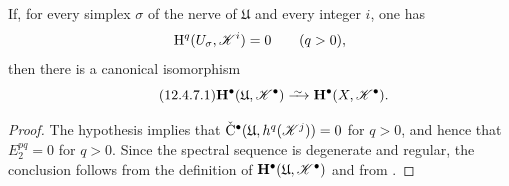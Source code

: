 \begin{corollary}[12.4.7]
\label{0.12.4.7}
If, for every simplex $\sigma$ of the nerve of $\mathfrak{U}$ and
every integer $i$, one has
\[
  \mathrm{H}^q(U_\sigma,\mathscr{K}^i)=0
  \qquad(q>0),
\]
then there is a canonical isomorphism
\begin{equation}
\label{0.12.4.7.1}
\tag{12.4.7.1}
  \bb{H}^\bullet(\mathfrak{U},\sh{K}^\bullet)
  \isoto
  \bb{H}^\bullet(X,\sh{K}^\bullet).
\end{equation}
\end{corollary}

\begin{proof}
The hypothesis implies that
$\check{\mathrm{C}}^\bullet
(\mathfrak{U},h^q(\mathscr{K}^j))=0$ for $q>0$, and hence that
$E_2^{pq}=0$ for $q>0$.
Since the spectral sequence  is degenerate and
regular, the conclusion follows from the definition
 of
$\mathbf{H}^\bullet(\mathfrak{U},\mathscr{K}^\bullet)$ and from
.
\end{proof}

